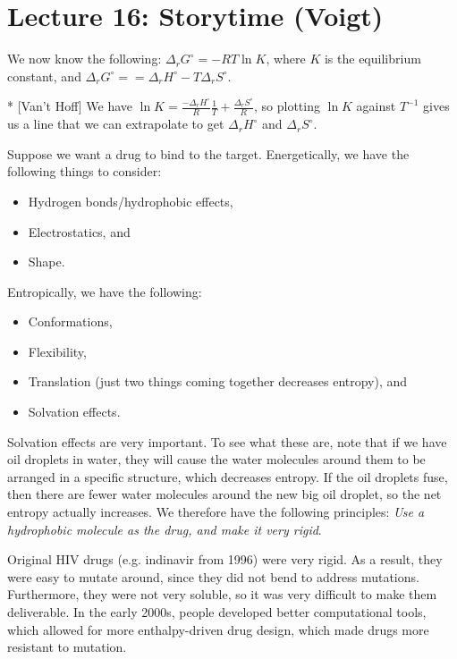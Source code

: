 \section*{Lecture 16: Storytime (Voigt)}
\setcounter{section}{16}

We now know the following: $\Delta_r G^\circ = -RT\ln K$, where $K$ is the equilibrium constant, and $\Delta_r G^\circ = = \Delta_r H^\circ - T\Delta_r S^\circ$.

\begin{cor}*
	[Van't Hoff]
	We have $\ln K = \frac{-\Delta_r H^\circ}{R} \frac 1T + \frac{\Delta_r S^\circ}{R}$, so plotting $\ln K$ against $T^{-1}$ gives us a line that we can extrapolate to get $\Delta_r H^\circ$ and $\Delta_r S^\circ$.
\end{cor}

\begin{exm}
	Suppose we want a drug to bind to the target. Energetically, we have the following things to consider:
	\begin{itemize}
		\item Hydrogen bonds/hydrophobic effects,
		\item Electrostatics, and
		\item Shape.
	\end{itemize}
	Entropically, we have the following:
	\begin{itemize}
		\item Conformations,
		\item Flexibility,
		\item Translation (just two things coming together decreases entropy), and
		\item Solvation effects.
	\end{itemize}
	Solvation effects are very important. To see what these are, note that if we have oil droplets in water, they will cause the water molecules around them to be arranged in a specific structure, which decreases entropy.
	If the oil droplets fuse, then there are fewer water molecules around the new big oil droplet, so the net entropy actually increases.
	We therefore have the following principles: \emph{Use a hydrophobic molecule as the drug, and make it very rigid}.
\end{exm}

\begin{exm}
	Original HIV drugs (e.g. indinavir from 1996) were very rigid. As a result, they were easy to mutate around, since they did not bend to address mutations.
	Furthermore, they were not very soluble, so it was very difficult to make them deliverable.
	In the early 2000s, people developed better computational tools, which allowed for more enthalpy-driven drug design, which made drugs more resistant to mutation.
\end{exm}

